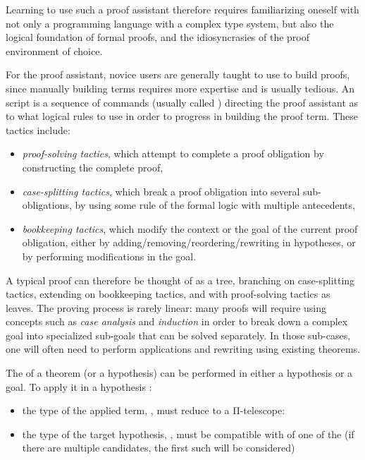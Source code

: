 Learning to use such a proof assistant therefore requires familiarizing oneself
with not only a programming language with a complex type system, but also the
logical foundation of formal proofs, and the idiosyncrasies of the proof
environment of choice.

For the \Coq{} proof assistant, novice users are generally taught to use \Ltac{}
to build proofs, since manually building \Gallina{} terms requires more
expertise and is usually tedious.  An \Ltac{} script is a sequence of commands
(usually called ) directing the proof assistant as to what
logical rules to use in order to progress in building the proof term.  These
tactics include:

\begin{itemize}

  \item \emph{proof-solving tactics}, which attempt to complete a proof
obligation by constructing the complete proof,

  \item \emph{case-splitting tactics}, which break a proof obligation into
several sub-obligations, by using some rule of the formal logic with multiple
antecedents,

  \item \emph{bookkeeping tactics}, which modify the context or the goal of the
current proof obligation, either by adding/removing/reordering/rewriting in
hypotheses, or by performing modifications in the goal.

\end{itemize}

A typical proof can therefore be thought of as a tree, branching on
case-splitting tactics, extending on bookkeeping tactics, and with proof-solving
tactics as leaves.  The proving process is rarely linear: many proofs will
require using concepts such as \emph{case analysis} and \emph{induction} in
order to break down a complex goal into specialized sub-goals that can be solved
separately.  In those sub-cases, one will often need to perform applications and
rewriting using existing theorems.

The  of a theorem (or a hypothesis)  can
be performed in either a hypothesis or a goal.  To apply it in a hypothesis
:

\begin{itemize}

  \item the type of the applied term, , must reduce to a Π-telescope:


  \item the type of the target hypothesis, , must be compatible
with of one of the  (if there are multiple candidates, the first
such  will be considered)

\end{itemize}

